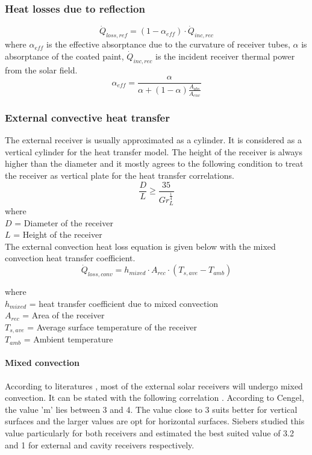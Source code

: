 \subsubsection{Heat losses due to reflection}
\begin{equation}
\dot Q_{loss,ref}=(1-\alpha_{eff})\cdot \dot Q_{inc,rec} 
\end{equation}
where $\alpha_{eff}$ is the effective absorptance due to the curvature of receiver tubes, $\alpha$ is absorptance of the coated paint, $\dot Q_{inc,rec}$ is the incident receiver thermal power from the solar field.
\begin{equation}
\alpha_{eff} = \frac {\alpha} {\alpha+(1-\alpha)\frac{A_{abs}}{A_{env}}}
\end{equation}
\subsubsection{External convective heat transfer}
The external receiver is usually approximated as a cylinder. It is considered as a vertical cylinder for the heat transfer model. The height of the receiver is always higher than the diameter and it mostly agrees to the following condition to treat the receiver as vertical plate for the heat transfer correlations. 
\begin{equation}
\frac{D}{L}\ge \frac{35}{Gr_{L}^{\frac{1}{4}}}
\end{equation}
where\\
$D$ = Diameter of the receiver\\
$L$ = Height of the receiver\\
The external convection heat loss equation is given below with the mixed convection heat transfer coefficient. 
\begin{equation}
\dot Q_{loss,conv} = h_{mixed}\cdot A_{rec}\cdot (T_{s,ave}-T_{amb})
\end{equation}

where\\
$h_{mixed}$ = heat transfer coefficient due to mixed convection\\
$A_{rec}$ = Area of the receiver\\
$T_{s,ave}$ = Average surface temperature of the receiver\\
$T_{amb}$ = Ambient temperature
\paragraph{Mixed convection}
According to literatures \cite{Siebers.1984}, most of the external solar receivers will undergo mixed convection. It can be stated with the following correlation \cite{Cengel.2003} \cite{Siebers.1984}. According to Cengel\cite{Cengel.2003}, the value 'm' lies between 3 and 4. The value close to 3 suits better for vertical surfaces and the larger values are opt for horizontal surfaces. Siebers \cite{Siebers.1984} studied this value particularly for both receivers and estimated the best suited value of 3.2 and 1 for external and cavity receivers respectively.

